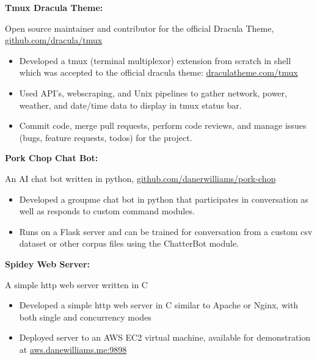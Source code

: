 \documentclass[letterpaper,10pt]{article}
\newcommand{\resumeItem}[2]{
  \item\small{
    {#1}{#2 \vspace{-2pt}}
  }
}
\newcommand{\resumeSubItem}[2]{\resumeItem{#1}{#2}\vspace{-4pt}}
\begin{document}
{      \resumeSubItem{\textbf{Tmux Dracula Theme: }}
      { Open source maintainer and contributor for the official Dracula Theme, \href{https://github.com/dracula/tmux}{github.com/dracula/tmux}
         \vspace{-5pt}
         \begin{itemize}
          \item Developed a tmux (terminal multiplexor) extension from scratch in shell which was accepted to the official dracula theme: \href{https://draculatheme.com/tmux}{draculatheme.com/tmux}
          \vspace{-2pt}
          \item Used API's, webscraping, and Unix pipelines to gather network, power, weather, and date/time data to display in tmux status bar.
          \vspace{-2pt}
          \item Commit code, merge pull requests, perform code reviews, and manage issues (bugs, feature requests, todos) for the project.
         \end{itemize}
      }
     \vspace{-2pt}
      \resumeSubItem{\textbf{Pork Chop Chat Bot: }}
     { An AI chat bot written in python, \href{https://github.com/danerwilliams/pork-chop}{github.com/danerwilliams/pork-chop}
        \vspace{-5pt}
        \begin{itemize}
            \item Developed a groupme chat bot in python that participates in conversation as well as responds to custom command modules.
            \vspace{-2pt}
            \item Runs on a Flask server and can be trained for conversation from a custom csv dataset or other corpus files using the ChatterBot module. 
        \end{itemize}
     }
    \vspace{-2pt}
    \resumeSubItem{\textbf{Spidey Web Server: }}
      { A simple http web server written in C
        \vspace{-5pt}
        \begin{itemize}
            \item Developed a simple http web server in C similar to Apache or Nginx, with both single and concurrency modes
            \vspace{-2pt}
            \item Deployed server to an AWS EC2 virtual machine, available for demonstration at \href{http://aws.danewilliams.me:9898}{aws.danewilliams.me:9898}
        \end{itemize}
      }

}
\end{document}
